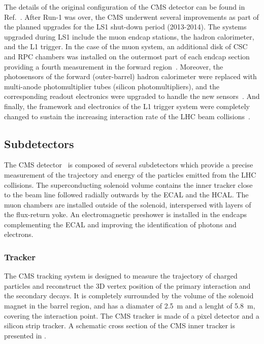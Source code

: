 The details of the original configuration of the CMS detector can be found in Ref.~\cite{CMS}. After Run-1 was over, the CMS underwent several improvements as part of the planned upgrades for the LS1 shut-down period (2013-2014). The systems upgraded during LS1 include the muon endcap stations, the hadron calorimeter, and the L1 trigger. In the case of the muon system, an additional disk of CSC and RPC chambers was installed on the outermost part of each endcap section providing a fourth measurement in the forward region~\cite{CMSMuonUpgrade}. Moreover, the photosensors of the forward (outer-barrel) hadron calorimeter were replaced with multi-anode photomultiplier tubes (silicon photomultipliers), and the corresponding readout electronics were upgraded to handle the new sensors~\cite{CMSHCALUpgrade}. And finally, the framework and electronics of the L1 trigger system were completely changed to sustain the increasing interaction rate of the LHC beam collisions~\cite{L1_Stage2}.


\subsection{Subdetectors}

The CMS detector~\cite{CMS} is composed of several subdetectors which provide a precise measurement of the trajectory and energy of the particles emitted from the LHC collisions. The superconducting solenoid volume contains the inner tracker close to the beam line followed radially outwards by the ECAL and the HCAL. The muon chambers are installed outside of the solenoid, interspersed with layers of the flux-return yoke. An electromagnetic preshower is installed in the endcaps complementing the ECAL and improving the identification of photons and electrons.


\subsubsection{Tracker}

The CMS tracking system is designed to measure the trajectory of charged particles and reconstruct the 3D vertex position of the primary interaction and the secondary decays. It is completely surrounded by the volume of the solenoid magnet in the barrel region, and has a diamater of \SI{2.5}{\m} and a lenght of \SI{5.8}{\m}, covering the interaction point. The CMS tracker is made of a pixel detector and a silicon strip tracker. A schematic cross section of the CMS inner tracker is presented in .

